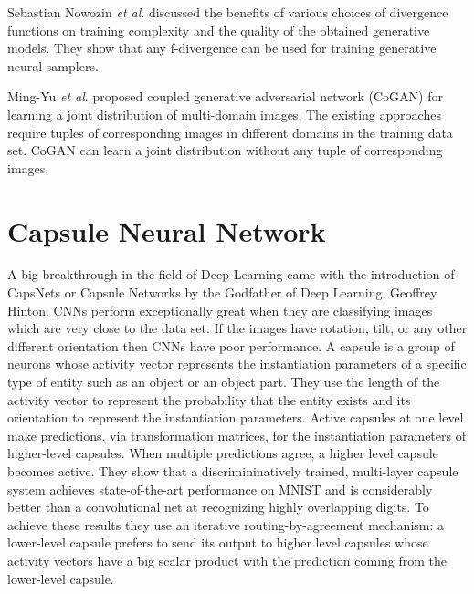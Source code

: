 Sebastian Nowozin \textit{et al}. \cite{vardivmin} discussed the benefits of various choices of divergence functions on training complexity and the quality of the obtained generative models. They show that any f-divergence can be used for training generative neural samplers. 
\par\bigskip

Ming-Yu \textit{et al}. \cite{copgan} proposed coupled generative adversarial network (CoGAN) for learning a joint distribution of multi-domain images. The existing approaches require tuples of corresponding images in different domains in the training data set. CoGAN can learn a joint distribution without any tuple of corresponding images.
\par\bigskip

\section{Capsule Neural Network} %
\label{sec:capsule_neural_network}
A big breakthrough in the field of Deep Learning came with the introduction of CapsNets or Capsule Networks \cite{capsnet} by the Godfather of Deep Learning, Geoffrey Hinton. CNNs perform exceptionally great when they are classifying images which are very close to the data set. If the images have rotation, tilt, or any other different orientation then CNNs have poor performance. A capsule is a group of neurons whose activity vector represents the instantiation parameters of a specific type of entity such as an object or an object part. They use the length of the activity vector to represent the probability that the entity exists and its orientation to represent the instantiation parameters. Active capsules at one level make predictions, via transformation matrices, for the instantiation parameters of higher-level capsules. When multiple predictions agree, a higher level capsule becomes active. They show that a discrimininatively trained, multi-layer capsule system achieves state-of-the-art performance on MNIST and is considerably better than a convolutional net at recognizing highly overlapping digits. To achieve these results they use an iterative routing-by-agreement mechanism: a lower-level capsule prefers to send its output to higher level capsules whose activity vectors have a big scalar product with the prediction coming from the lower-level capsule.
